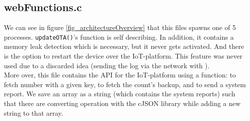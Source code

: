 \subsection{webFunctions.c}
We can see in figure \ref{fig_architectureOverview} that this files spawns one of 5 processes.
\verb!updateOTA()!'s function is self describing. In addition, it contains a memory leak detection
which is necessary, but it never gets activated. And there is the option to restart the device
over the IoT-platform. This feature was never used due to a discarded idea (sending the log
via the network with \cite{gitSendLog}).\\
More over, this file contains the API for the IoT-platform using a function: to fetch number with a
given key, to fetch the count's backup, and to send a system report. We save an array
as a string (which contains the system reports)
such that there are converting operation with the cJSON library while adding a new
string to that array.


